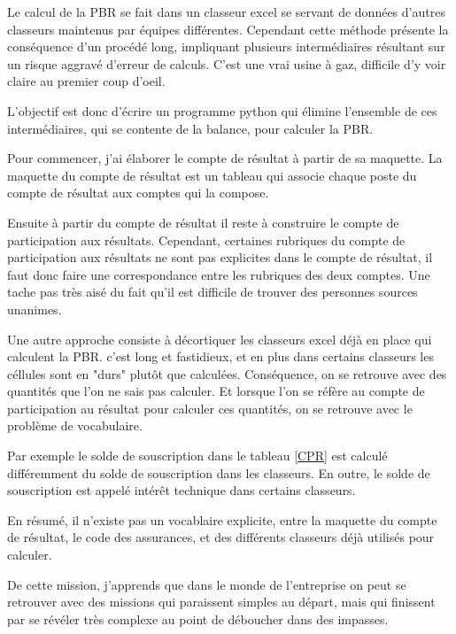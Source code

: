 Le calcul de la PBR se fait dans un classeur excel se servant de données d'autres classeurs maintenus par équipes différentes. Cependant cette méthode présente la conséquence d'un procédé long, impliquant plusieurs intermédiaires résultant sur un  risque aggravé d'erreur de calculs. C'est une vrai usine à gaz, difficile d'y voir claire au premier coup d'oeil.

L'objectif est donc d'écrire un programme python qui élimine l'ensemble de ces intermédiaires, qui se contente de la balance, pour calculer la PBR.

Pour commencer, j'ai élaborer le compte de résultat à partir de sa maquette. 
La maquette du compte de résultat est un tableau qui associe chaque poste du compte de résultat aux comptes qui la compose.

Ensuite à partir du compte de résultat il reste à construire le compte de participation aux résultats. 
Cependant, certaines rubriques du compte de participation aux résultats ne sont pas explicites dans le compte de résultat, il faut donc faire une correspondance entre les rubriques des deux comptes. Une tache pas très aisé du fait qu'il est difficile de trouver des personnes sources unanimes.

Une autre approche consiste à décortiquer les classeurs excel déjà en place qui calculent la PBR. c'est long et fastidieux, et en plus dans certains classeurs les céllules sont en "durs" plutôt que calculées. Conséquence, on se retrouve avec des quantités que l'on ne sais pas calculer. Et lorsque l'on se réfère au compte de participation au résultat pour calculer ces quantités, on se retrouve avec le problème de vocabulaire.


Par exemple le solde de souscription dans le tableau \ref{CPR} est calculé différemment du solde de souscription dans les classeurs. En outre, le solde de souscription est appelé intérêt technique dans certains classeurs.

En résumé, il n'existe pas un vocablaire explicite, entre la maquette du compte de résultat, le code des assurances, et des différents classeurs déjà utilisés pour calculer.

De cette mission, j’apprends que dans le monde de l'entreprise on peut se retrouver avec des missions qui paraissent simples au départ, mais qui finissent par se révéler très complexe au point de déboucher dans des impasses.

